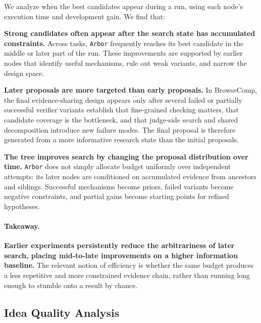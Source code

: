 \documentclass{llmxive}
\providecommand{\arbor}{\texttt{Arbor}}
\begin{document}
We analyze when the best candidates appear during a run, using each node's execution time and development gain. We find that:
 
\textbf{Strong candidates often appear after the search state has accumulated constraints.}
Across tasks, \arbor{} frequently reaches its best candidate in the middle or later part of the run. These improvements are supported by earlier nodes that identify useful mechanisms, rule out weak variants, and narrow the design space.
 
\textbf{Later proposals are more targeted than early proposals.}
In BrowseComp, the final evidence-sharing design appears only after several failed or partially successful verifier variants establish that fine-grained checking matters, that candidate coverage is the bottleneck, and that judge-side search and shared decomposition introduce new failure modes. The final proposal is therefore generated from a more informative research state than the initial proposals.
 
\textbf{The tree improves search by changing the proposal distribution over time.}
\arbor{} does not simply allocate budget uniformly over independent attempts: its later nodes are conditioned on accumulated evidence from ancestors and siblings. Successful mechanisms become priors, failed variants become negative constraints, and partial gains become starting points for refined hypotheses.
 
\paragraph{Takeaway.}
\textbf{Earlier experiments persistently reduce the arbitrariness of later search, placing mid-to-late improvements on a higher information baseline.}
The relevant notion of efficiency is whether the same budget produces a less repetitive and more constrained evidence chain, rather than running long enough to stumble onto a result by chance.
 
\subsection{Idea Quality Analysis}
\label{sec:discussion-ideas}
 
\end{document}
